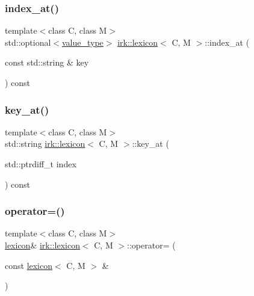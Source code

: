 \mbox{\label{classirk_1_1lexicon_a41b1c0e665b7fa6aed0f92ef9facf82c}} 
\subsubsection{\texorpdfstring{index\+\_\+at()}{index\_at()}}
{\footnotesize\ttfamily template$<$class C, class M$>$ \\
std\+::optional$<$\mbox{\hyperlink{classirk_1_1lexicon_aeac00a0cdd67339d9d09783a1c930dd2}{value\+\_\+type}}$>$ \mbox{\hyperlink{classirk_1_1lexicon}{irk\+::lexicon}}$<$ C, M $>$\+::index\+\_\+at (\begin{DoxyParamCaption}\item[{const std\+::string \&}]{key }\end{DoxyParamCaption}) const\hspace{0.3cm}{\ttfamily [inline]}}

\mbox{\label{classirk_1_1lexicon_ab93c840be695d2794d2d39ac223103cd}} 
\subsubsection{\texorpdfstring{key\+\_\+at()}{key\_at()}}
{\footnotesize\ttfamily template$<$class C, class M$>$ \\
std\+::string \mbox{\hyperlink{classirk_1_1lexicon}{irk\+::lexicon}}$<$ C, M $>$\+::key\+\_\+at (\begin{DoxyParamCaption}\item[{std\+::ptrdiff\+\_\+t}]{index }\end{DoxyParamCaption}) const\hspace{0.3cm}{\ttfamily [inline]}}

\mbox{\label{classirk_1_1lexicon_a4563e93e133a21588097c4bcc20335bd}} 
\subsubsection{\texorpdfstring{operator=()}{operator=()}\hspace{0.1cm}{\footnotesize\ttfamily [1/2]}}
{\footnotesize\ttfamily template$<$class C, class M$>$ \\
\mbox{\hyperlink{classirk_1_1lexicon}{lexicon}}\& \mbox{\hyperlink{classirk_1_1lexicon}{irk\+::lexicon}}$<$ C, M $>$\+::operator= (\begin{DoxyParamCaption}\item[{const \mbox{\hyperlink{classirk_1_1lexicon}{lexicon}}$<$ C, M $>$ \&}]{ }\end{DoxyParamCaption})\hspace{0.3cm}{\ttfamily [default]}}


